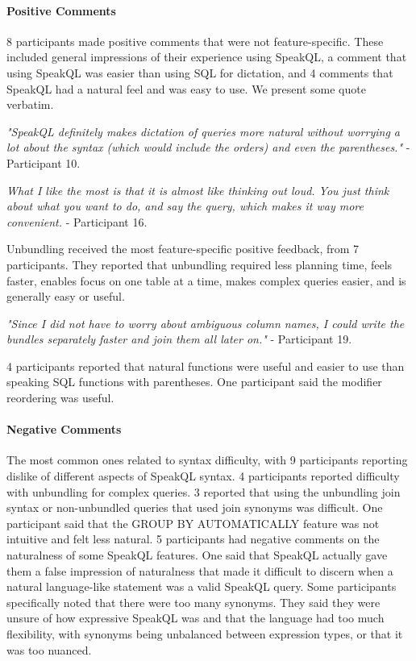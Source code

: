\paragraph{\textbf{Positive Comments}} 
8 participants made positive comments that were not feature-specific. 
These included general impressions of their experience using SpeakQL, a comment that using SpeakQL was easier than using SQL for dictation, and 4 comments that SpeakQL had a natural feel and was easy to use.
We present some quote verbatim. 

\vspace{1mm}
\emph{"SpeakQL definitely makes dictation of queries more natural without worrying a lot about the syntax (which would include the orders) and even the parentheses."}
- Participant 10.

\vspace{1mm}
\emph{What I like the most is that it is almost like thinking out loud. You just think about what you want to do, and say the query, which makes it way more convenient.}
- Participant 16.

\vspace{1mm}
Unbundling received the most feature-specific positive feedback, from 7 participants. 
They reported that unbundling required less planning time, feels faster, enables focus on one table at a time, makes complex queries easier, and is generally easy or useful.

\vspace{1mm}
\emph{"Since I did not have to worry about ambiguous column names, I could write the bundles separately faster and join them all later on."}
- Participant 19.

\vspace{1mm}
4 participants reported that natural functions were useful and easier to use than speaking SQL functions with parentheses. One participant said the modifier reordering was useful.


\paragraph{\textbf{Negative Comments}}
The most common ones related to syntax difficulty, with 9 participants reporting dislike of different aspects of SpeakQL syntax. 
4 participants reported difficulty with unbundling for complex queries. 
3 reported that using the unbundling join syntax or non-unbundled queries that used join synonyms was difficult. 
One participant said that the GROUP BY AUTOMATICALLY feature was not intuitive and felt less natural.
5 participants had negative comments on the naturalness of some SpeakQL features. 
One said that SpeakQL actually gave them a false impression of naturalness that made it difficult to discern when a natural language-like statement was a valid SpeakQL query. 
Some participants specifically noted that there were too many synonyms. 
They said they were unsure of how expressive SpeakQL was and that the language had too much flexibility, with synonyms being unbalanced between expression types, or that it was too nuanced. 


